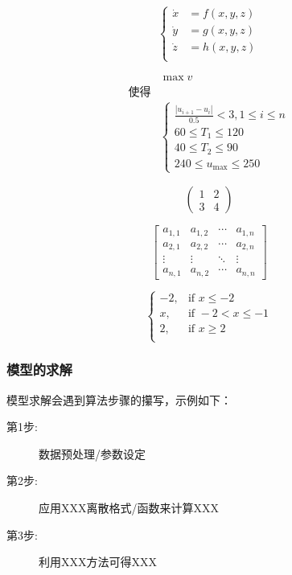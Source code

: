 \documentclass[12pt,utf8]{article}
\begin{document}
\begin{equation}
\left\{
\begin{aligned}
 \dot{x}&=f(x,y,z)\\
 \dot{y}&=g(x,y,z)\\
 \dot{z}&=h(x,y,z)\\
\end{aligned}
\right.
\end{equation}

\begin{equation*}
\begin{aligned}
&\max v  \\
\text{使得} & \\
&\begin{cases}
  \frac{|u_{i+1}-u_{i}|}{0.5}<3, 1\le i\le n\\
  60\le T_1 \le 120\\
  40 \le T_2 \le 90 \\
  240 \le u_{\text{max}} \le 250
\end{cases}
\end{aligned}
\end{equation*}

\[
\begin{pmatrix}
1 & 2 \\
3 & 4
\end{pmatrix}
\]

\[
 \begin{bmatrix}
   a_{1,1} & a_{1,2} & \cdots & a_{1,n} \\
   a_{2,1} & a_{2,2} & \cdots & a_{2,n} \\
   \vdots  & \vdots  & \ddots & \vdots  \\
   a_{n,1} & a_{n,2} & \cdots & a_{n,n} 
 \end{bmatrix}
\]

\[
\begin{cases}
 -2, & \text{if~} x\le-2 \\
 x, & \text{if~}  -2<x\le-1 \\
 2,  & \text{if~}  x\ge2 \\
\end{cases}
\]


\subsubsection{模型的求解}

模型求解会遇到算法步骤的攥写，示例如下：

\begin{description}
\item[第1步:] 数据预处理/参数设定
\item[第2步:] 应用XXX离散格式/函数来计算XXX
\item[第3步:] 利用XXX方法可得XXX
\end{description}
\end{document}
